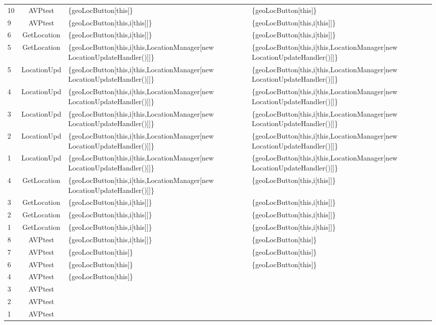 \documentclass[letterpaper,twocolumn,10pt]{article}
\begin{document}
\begin{center}
\begin{small}
\begin{tabular}{|l|c|*{2}{p{7cm}|}}
  10 & AVPtest & \{geoLocButton[this]\} & \{geoLocButton[this]\} \\
  9 & AVPtest & \{geoLocButton[this,i[this]]\} & \{geoLocButton[this,i[this]]\} \\
  6 & GetLocation & \{geoLocButton[this,i[this]]\} & \{geoLocButton[this,i[this]]\} \\
  5 & GetLocation & \{geoLocButton[this,i[this,LocationManager[new LocationUpdateHandler()]]\} & \{geoLocButton[this,i[this,LocationManager[new LocationUpdateHandler()]]\} \\
  5 & LocationUpd & \{geoLocButton[this,i[this,LocationManager[new LocationUpdateHandler()]]\} & \{geoLocButton[this,i[this,LocationManager[new LocationUpdateHandler()]]\} \\
  4 & LocationUpd & \{geoLocButton[this,i[this,LocationManager[new LocationUpdateHandler()]]\} & \{geoLocButton[this,i[this,LocationManager[new LocationUpdateHandler()]]\} \\
  3 & LocationUpd & \{geoLocButton[this,i[this,LocationManager[new LocationUpdateHandler()]]\} & \{geoLocButton[this,i[this,LocationManager[new LocationUpdateHandler()]]\} \\
  2 & LocationUpd & \{geoLocButton[this,i[this,LocationManager[new LocationUpdateHandler()]]\} & \{geoLocButton[this,i[this,LocationManager[new LocationUpdateHandler()]]\} \\
  1 & LocationUpd & \{geoLocButton[this,i[this,LocationManager[new LocationUpdateHandler()]]\} & \{geoLocButton[this,i[this,LocationManager[new LocationUpdateHandler()]]\} \\
  4 & GetLocation & \{geoLocButton[this,i[this,LocationManager[new LocationUpdateHandler()]]\} & \{geoLocButton[this,i[this]]\} \\
  3 & GetLocation & \{geoLocButton[this,i[this]]\} & \{geoLocButton[this,i[this]]\} \\
  2 & GetLocation & \{geoLocButton[this,i[this]]\} & \{geoLocButton[this,i[this]]\} \\
  1 & GetLocation & \{geoLocButton[this,i[this]]\} & \{geoLocButton[this,i[this]]\} \\
  8 & AVPtest & \{geoLocButton[this,i[this]]\} & \{geoLocButton[this]\} \\
  7 & AVPtest & \{geoLocButton[this]\} & \{geoLocButton[this]\} \\
  6 & AVPtest & \{geoLocButton[this]\} & \{geoLocButton[this]\} \\
  4 & AVPtest & \{geoLocButton[this]\} &  \\
  3 & AVPtest &  & \\
  2 & AVPtest &  & \\
  1 & AVPtest &  & \\
  \hline
\end{tabular}
\end{small}
\end{center}

\end{document}
